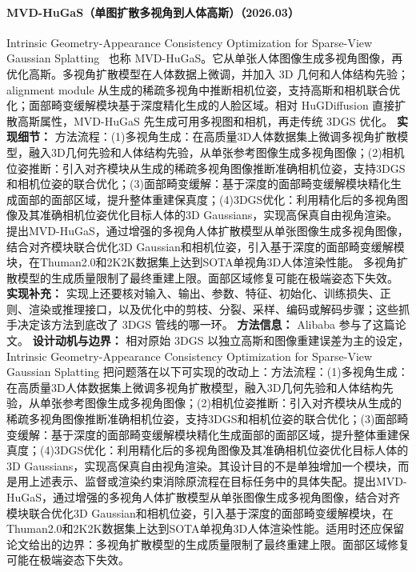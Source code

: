 \paragraph{MVD-HuGaS（单图扩散多视角到人体高斯）（2026.03）}
Intrinsic Geometry-Appearance Consistency Optimization for Sparse-View Gaussian Splatting~\cite{2603_02893} 也称 MVD-HuGaS。它从单张人体图像生成多视角图像，再优化高斯。多视角扩散模型在人体数据上微调，并加入 3D 几何和人体结构先验；alignment module 从生成的稀疏多视角中推断相机位姿，支持高斯和相机联合优化；面部畸变缓解模块基于深度精化生成的人脸区域。相对 HuGDiffusion 直接扩散高斯属性，MVD-HuGaS 先生成可用多视图和相机，再走传统 3DGS 优化。
\textbf{实现细节：} 方法流程：(1)多视角生成：在高质量3D人体数据集上微调多视角扩散模型，融入3D几何先验和人体结构先验，从单张参考图像生成多视角图像；(2)相机位姿推断：引入对齐模块从生成的稀疏多视角图像推断准确相机位姿，支持3DGS和相机位姿的联合优化；(3)面部畸变缓解：基于深度的面部畸变缓解模块精化生成面部的面部区域，提升整体重建保真度；(4)3DGS优化：利用精化后的多视角图像及其准确相机位姿优化目标人体的3D Gaussians，实现高保真自由视角渲染。 提出MVD-HuGaS，通过增强的多视角人体扩散模型从单张图像生成多视角图像，结合对齐模块联合优化3D Gaussian和相机位姿，引入基于深度的面部畸变缓解模块，在Thuman2.0和2K2K数据集上达到SOTA单视角3D人体渲染性能。 多视角扩散模型的生成质量限制了最终重建上限。面部区域修复可能在极端姿态下失效。
\textbf{实现补充：} 实现上还要核对输入、输出、参数、特征、初始化、训练损失、正则、渲染或推理接口，以及优化中的剪枝、分裂、采样、编码或解码步骤；这些抓手决定该方法到底改了 3DGS 管线的哪一环。
\textbf{方法信息：} Alibaba 参与了这篇论文。
\textbf{设计动机与边界：} 相对原始 3DGS 以独立高斯和图像重建误差为主的设定，Intrinsic Geometry-Appearance Consistency Optimization for Sparse-View Gaussian Splatting 把问题落在以下可实现的改动上：方法流程：(1)多视角生成：在高质量3D人体数据集上微调多视角扩散模型，融入3D几何先验和人体结构先验，从单张参考图像生成多视角图像；(2)相机位姿推断：引入对齐模块从生成的稀疏多视角图像推断准确相机位姿，支持3DGS和相机位姿的联合优化；(3)面部畸变缓解：基于深度的面部畸变缓解模块精化生成面部的面部区域，提升整体重建保真度；(4)3DGS优化：利用精化后的多视角图像及其准确相机位姿优化目标人体的3D Gaussians，实现高保真自由视角渲染。其设计目的不是单独增加一个模块，而是用上述表示、监督或渲染约束消除原流程在目标任务中的具体失配。提出MVD-HuGaS，通过增强的多视角人体扩散模型从单张图像生成多视角图像，结合对齐模块联合优化3D Gaussian和相机位姿，引入基于深度的面部畸变缓解模块，在Thuman2.0和2K2K数据集上达到SOTA单视角3D人体渲染性能。适用时还应保留论文给出的边界：多视角扩散模型的生成质量限制了最终重建上限。面部区域修复可能在极端姿态下失效。
